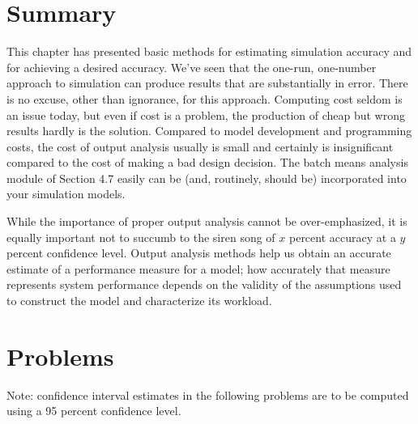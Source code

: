 \section{Summary}
\label{sec:output-summary}

This chapter has presented basic methods for estimating simulation accuracy
and for achieving a desired accuracy. We've seen that the one-run, one-number
approach to simulation can produce results that are substantially in error.
There is no excuse, other than ignorance, for this approach. Computing cost
seldom is an issue today, but even if cost is a problem, the production of
cheap but wrong results hardly is the solution. Compared to model development
and programming costs, the cost of output analysis usually is small and
certainly is insignificant compared to the cost of making a bad design
decision. The batch means analysis module of Section 4.7 easily can be (and,
routinely, should be) incorporated into your simulation models.

While the importance of proper output analysis cannot be over-emphasized, it
is equally important not to succumb to the siren song of $x$ percent accuracy
at a $y$ percent confidence level. Output analysis methods help us obtain an
accurate estimate of a performance measure for a model; how accurately that
measure represents system performance depends on the validity of the
assumptions used to construct the model and characterize its workload.

\section{Problems}
\label{sec:output-problems}

Note: confidence interval estimates in the following problems are to be
computed using a 95 percent confidence level.

